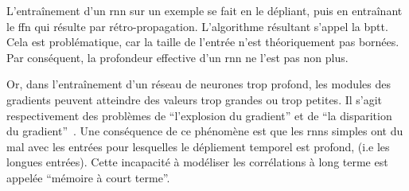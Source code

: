 L'entraînement d'un \gls{rnn} sur un exemple se fait en le dépliant, 
puis en entraînant le \gls{ffn} qui résulte par rétro-propagation.
L'algorithme résultant s'appel la \gls{bptt}.
Cela est problématique, car la taille de l'entrée n'est théoriquement pas bornées.
Par conséquent, la profondeur effective d'un \gls{rnn} ne l'est pas non plus.

Or, dans l'entraînement d'un réseau de neurones trop profond,
les modules des gradients peuvent atteindre des valeurs trop grandes ou trop petites.
Il s'agit respectivement des problèmes de ``l'explosion du gradient'' 
et de ``la disparition du gradient''~\cite{Bengio_Simard_Frasconi_1994}.
Une conséquence de ce phénomène est que 
les \glspl{rnn} simples ont du mal avec les entrées pour lesquelles le dépliement temporel est profond,
(i.e les longues entrées).
Cette incapacité à modéliser les corrélations à long terme est appelée ``mémoire à court terme''.


